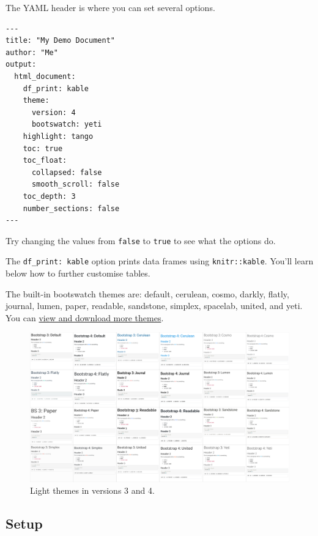 \documentclass[
  oneside]{book}
\begin{document}
The YAML header is where you can set several options.

\begin{verbatim}
---
title: "My Demo Document"
author: "Me"
output:
  html_document:
    df_print: kable
    theme: 
      version: 4
      bootswatch: yeti
    highlight: tango
    toc: true
    toc_float:
      collapsed: false
      smooth_scroll: false
    toc_depth: 3
    number_sections: false
---
\end{verbatim}

\begin{info}
Try changing the values from \texttt{false} to \texttt{true} to see what the options do.

\end{info}

The \texttt{df\_print:\ kable} option prints data frames using \texttt{knitr::kable}. You'll learn below how to further customise tables.

The built-in bootswatch themes are: default, cerulean, cosmo, darkly, flatly, journal, lumen, paper, readable, sandstone, simplex, spacelab, united, and yeti. You can \href{https://bootswatch.com/4/}{view and download more themes}.

\begin{figure}

{\centering \includegraphics[width=1\linewidth]{images/repro/bootswatch} 

}

\caption{Light themes in versions 3 and 4.}\label{fig:img-bootswatch}
\end{figure}

\hypertarget{setup}{%
\subsection{Setup}\label{setup}}
\end{document}
